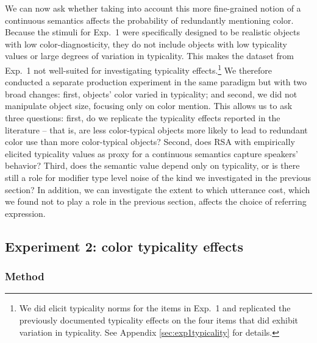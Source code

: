 \documentclass[11pt]{article}
\newcommand{\appref}[1]{Appendix \ref{#1}}
\begin{document}
We can now ask whether taking into account this more fine-grained notion of a continuous semantics affects the probability of redundantly mentioning color. Because the stimuli for Exp.~1 were specifically designed to be realistic objects with low color-diagnosticity, they do not include objects with low typicality values or large degrees of variation in typicality. This makes the dataset from Exp.~1 not well-suited for investigating typicality effects.\footnote{We did elicit typicality norms for the items in Exp.~1 and replicated the previously documented typicality effects on the four items that did exhibit variation in typicality. See \appref{sec:exp1typicality} for details.} We therefore conducted a separate production experiment in the same paradigm but with two broad changes: first, objects' color varied in typicality; and second, we did not manipulate object size, focusing only on color mention. This allows us to ask three questions: first, do we replicate the typicality effects reported in the literature -- that is, are less color-typical objects more likely to lead to redundant color use than more color-typical objects? Second, does RSA with empirically elicited typicality values as proxy for a continuous semantics capture speakers' behavior? Third, does the semantic value depend only on typicality, or is there still a role for modifier type level noise  of the kind we investigated in the previous section? In addition, we can investigate the extent to which utterance cost, which we found not to play a role in the previous section, affects the choice of referring expression.



\subsection{Experiment 2: color typicality effects}
\label{sec:modifiertypicalityeffects}



\subsubsection{Method}
\end{document}
